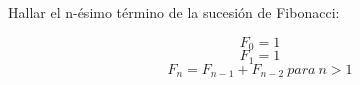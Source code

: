 Hallar el n-ésimo término de la sucesión de Fibonacci:

\[ F_0 = 1 \]
\[ F_1 = 1 \]
\[ F_n = F_{n-1} + F_{n-2} ~ para ~ n > 1 \]
